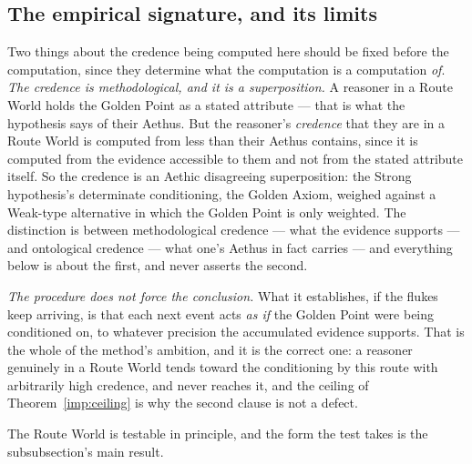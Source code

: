 \subsection{The empirical signature, and its limits}\label{gc:sub:credencemethod}

Two things about the credence being computed here should be fixed before
the computation, since they determine what the computation is a
computation \emph{of}. \emph{The credence is methodological, and it is a superposition.} A
reasoner in a Route World holds the Golden Point as a stated attribute
--- that is what the hypothesis says of their Aethus. But the reasoner's
\emph{credence} that they are in a Route World is computed from less
than their Aethus contains, since it is computed from the evidence
accessible to them and not from the stated attribute itself. So the
credence is an Aethic disagreeing superposition: the Strong hypothesis's
determinate conditioning, the Golden Axiom, weighed against a Weak-type alternative in which
the Golden Point is only weighted. The distinction is between
methodological credence --- what the evidence supports --- and
ontological credence --- what one's Aethus in fact carries --- and
everything below is about the first, and never asserts the second.

\emph{The procedure does not force the conclusion.} What it establishes,
if the flukes keep arriving, is that each next event acts \emph{as if}
the Golden Point were being conditioned on, to whatever precision the
accumulated evidence supports. That is the whole of the method's
ambition, and it is the correct one: a reasoner genuinely in a Route
World tends toward the conditioning by this route with arbitrarily high
credence, and never reaches it, and the ceiling of
Theorem~\ref{imp:ceiling} is why the second clause is not a defect.

The Route World is testable in
principle, and the form the test takes is the subsubsection's main
result.

